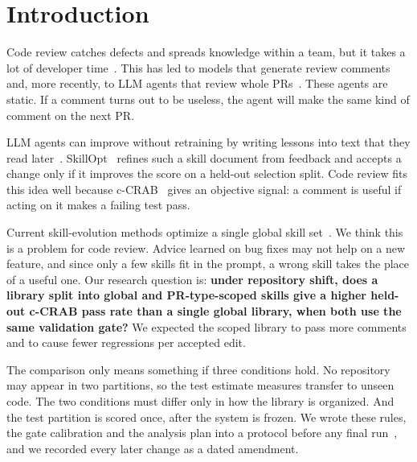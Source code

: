 \documentclass[sigconf, authorversion, nonacm]{acmart}
\begin{document}
\maketitle

\section{Introduction}
Code review catches defects and spreads knowledge within a team, but it takes a lot of developer time~\cite{bacchelli2013}. This has led to models that generate review comments~\cite{tufano2022pretrained, li2022codereviewer} and, more recently, to LLM agents that review whole PRs~\cite{zhang2026ccrab}. These agents are static. If a comment turns out to be useless, the agent will make the same kind of comment on the next PR.

LLM agents can improve without retraining by writing lessons into text that they read later~\cite{shinn2023reflexion, madaan2023selfrefine, zhao2024expel, wang2023voyager}. SkillOpt~\cite{yang2026skillopt} refines such a skill document from feedback and accepts a change only if it improves the score on a held-out selection split. Code review fits this idea well because c-CRAB~\cite{zhang2026ccrab} gives an objective signal: a comment is useful if acting on it makes a failing test pass.

Current skill-evolution methods optimize a single global skill set~\cite{yang2026skillopt, liu2026dynamics}. We think this is a problem for code review. Advice learned on bug fixes may not help on a new feature, and since only a few skills fit in the prompt, a wrong skill takes the place of a useful one. Our research question is: \textbf{under repository shift, does a library split into global and PR-type-scoped skills give a higher held-out c-CRAB pass rate than a single global library, when both use the same validation gate?} We expected the scoped library to pass more comments and to cause fewer regressions per accepted edit.

The comparison only means something if three conditions hold. No repository may appear in two partitions, so the test estimate measures transfer to unseen code. The two conditions must differ only in how the library is organized. And the test partition is scored once, after the system is frozen. We wrote these rules, the gate calibration and the analysis plan into a protocol before any final run~\cite{nosek2018prereg}, and we recorded every later change as a dated amendment.
\end{document}
